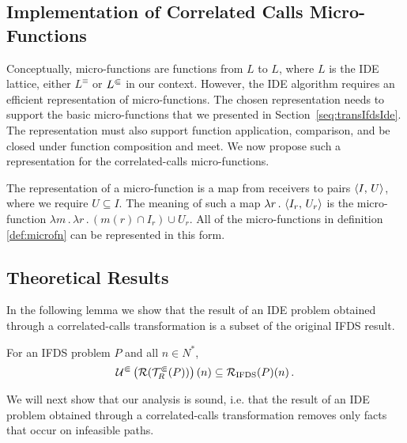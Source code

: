 \subsection{Implementation of Correlated Calls Micro-Functions}

Conceptually, micro-functions are functions from $L$ to $L$, where $L$
is the IDE lattice, either $L^\equiv$ or $L^\Subset$ in our context. However,
the IDE algorithm requires an efficient representation of micro-functions.
The chosen representation needs to support the basic micro-functions that
we presented in Section~\ref{seq:transIfdsIde}. The representation must also
support function application, comparison, and be closed under function composition
and meet. We now propose such a representation for the correlated-calls micro-functions.

The representation of a micro-function is a map from receivers to pairs $\left\langle I,\,U\right\rangle$,
where we require $U \subseteq I$.
The meaning of such a map $\lambda r\,.\,\left\langle I_r,\,U_r\right\rangle$ is the micro-function
$\lambda m\,.\,\lambda r\,.\,(m(r)\cap I_r) \cup U_r$. All of the micro-functions
in definition \ref{def:microfn} can be represented in this form. 

\subsection{Theoretical Results}

In the following lemma we show that the result of an IDE problem obtained through a correlated-calls transformation is a subset of the original IFDS result.

\begin{lemma}[Precision]\label{lem:subsetifds}
    For an IFDS problem $P$ and all ${n\in N^*}$,
    \begin{equation}\label{eq:correct}
      \mathcal U^\Subset\left(\mathcal R(\mathcal T^\Subset_R(P))\right)(n)
      \subseteq
      \mathcal R_{\text{IFDS}}(P)(n)\,.
    \end{equation}
\end{lemma}

We will next show that our analysis is sound, i.e. that the result of an IDE problem obtained through a correlated-calls transformation removes only facts that occur on infeasible paths. 


